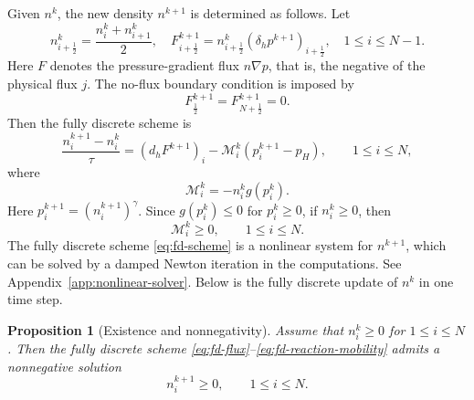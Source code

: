 \documentclass[11pt]{article}
\theoremstyle{plain}
\numberwithin{equation}{section}
\newtheorem{proposition}{Proposition}[section]
\begin{document}
Given \(n^k\), the new density \(n^{k+1}\) is determined as follows. Let
\begin{equation}\label{eq:fd-flux}
    n_{i+\frac12}^k=\frac{n_i^k+n_{i+1}^k}{2}, \quad
    F_{i+\frac12}^{k+1}
    =
    n_{i+\frac12}^k(\delta_h p^{k+1})_{i+\frac12},
    \quad
    1\le i\le N-1.
\end{equation}
Here \(F\) denotes the pressure-gradient flux \(n\nabla p\), that is, the
negative of the physical flux \(j\).
The no-flux boundary condition is imposed by
\begin{equation}\label{eq:fd-no-flux}
    F_{\frac12}^{k+1}=F_{N+\frac12}^{k+1}=0 .
\end{equation}
Then the fully discrete scheme is
\begin{equation}\label{eq:fd-scheme}
    \frac{n_i^{k+1}-n_i^k}{\tau}
    =
    (d_hF^{k+1})_i
    -
    \mathcal M_i^k\left(p_i^{k+1}-p_H\right),
    \qquad 1\le i\le N,
\end{equation}
where
\begin{equation}\label{eq:fd-reaction-mobility}
    \mathcal M_i^k
    =
    -n_i^k g(p_i^k).
\end{equation}
Here \(p_i^{k+1}=(n_i^{k+1})^\gamma\). 
Since \(g(p_i^k)\le0\) for \(p_i^k\ge0\), if \(n_i^k\ge0\), then
\begin{equation} \label{prop:M_discrete}
	\mathcal M_i^k\ge0,\qquad 1\le i\le N. 
\end{equation}
The fully discrete scheme \eqref{eq:fd-scheme} is a nonlinear system for \(n^{k+1}\), which can be solved
by a damped Newton iteration in the computations. See
Appendix~\ref{app:nonlinear-solver}. 
Below is the fully discrete update of $n^k$ in one time step. 

\begin{center}
\end{center}



\begin{proposition}[Existence and nonnegativity]
\label{prop:fd-existence-nonnegativity}
Assume that \(n_i^k\ge0\) for \(1\le i\le N\). Then the fully discrete
scheme \eqref{eq:fd-flux}--\eqref{eq:fd-reaction-mobility} admits a
nonnegative solution
\[
    n_i^{k+1}\ge0,\qquad 1\le i\le N .
\]
\end{proposition}
\end{document}
